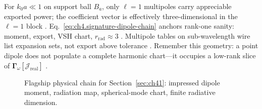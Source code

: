 For $k_0 a\ll 1$ on support ball $B_a$, only $\ell=1$ multipoles carry appreciable exported power; the coefficient vector is effectively three-dimensional in the $\ell=1$ block \cite{jackson1999}.
Eq.~\eqref{eq:ch4.signature-dipole-chain} anchors rank-one sanity: moment, export, VSH chart, $r_{\mathrm{rad}}\approx 3$ \cite{jackson1999}. Multipole tables on sub-wavelength wire list expansion sets, not export above tolerance \cite{devaney2004}.
\medskip
 Remember this geometry: a point dipole does not populate a complete harmonic chart---it occupies a low-rank slice of $\boldsymbol{\Gamma}_\omega[\mathcal{J}_{\mathrm{real}}]$ \cite{harrington2001}.
\begin{figure}[t]
\centering
{}
\caption{Flagship physical chain for Section~\ref{sec:ch41}: impressed dipole moment, radiation map, spherical-mode chart, finite radiative dimension.}
\label{fig:ch4.signature-dipole-chain}
\end{figure}
